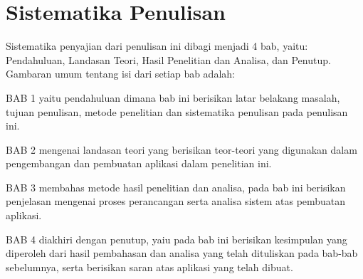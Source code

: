 \documentclass[pi.tex]{subfile}
\begin{document}
\section{Sistematika Penulisan}
Sistematika penyajian dari penulisan ini dibagi menjadi 4 bab, yaitu: Pendahuluan, Landasan Teori, Hasil Penelitian dan Analisa, dan Penutup. Gambaran umum tentang isi dari setiap bab adalah:

BAB 1 yaitu pendahuluan dimana bab ini berisikan latar belakang masalah, tujuan penulisan, metode penelitian dan sistematika penulisan pada penulisan ini.


BAB 2 mengenai landasan teori yang berisikan teor-teori yang digunakan dalam pengembangan dan pembuatan aplikasi dalam penelitian ini.


BAB 3 membahas metode hasil penelitian dan analisa, pada bab ini berisikan penjelasan mengenai proses perancangan serta analisa sistem atas pembuatan aplikasi.


BAB 4 diakhiri dengan penutup, yaiu pada bab ini berisikan kesimpulan yang diperoleh dari hasil pembahasan dan analisa yang telah dituliskan pada bab-bab sebelumnya, serta berisikan saran atas aplikasi yang telah dibuat.
\end{document}
